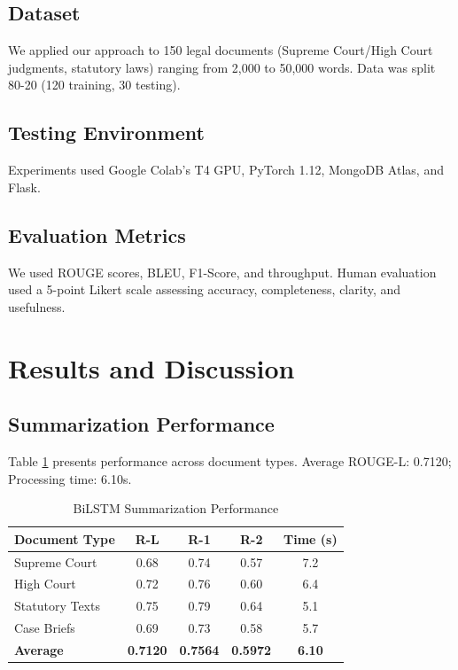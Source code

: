 \documentclass[conference]{IEEEtran}
\begin{document}
\subsection{Dataset}
We applied our approach to 150 legal documents (Supreme Court/High Court judgments, statutory laws) ranging from 2,000 to 50,000 words. Data was split 80-20 (120 training, 30 testing).

\subsection{Testing Environment}
Experiments used Google Colab’s T4 GPU, PyTorch 1.12, MongoDB Atlas, and Flask.

\subsection{Evaluation Metrics}
We used ROUGE scores, BLEU, F1-Score, and throughput. Human evaluation used a 5-point Likert scale assessing accuracy, completeness, clarity, and usefulness.

\section{Results and Discussion}

\subsection{Summarization Performance}
Table \ref{tab:summarization_results} presents performance across document types. Average ROUGE-L: 0.7120; Processing time: 6.10s.

\begin{table}[ht]
\centering
\caption{BiLSTM Summarization Performance}
\label{tab:summarization_results}
\begin{tabular}{@{}lcccc@{}}
\toprule
\textbf{Document Type} & \textbf{R-L} & \textbf{R-1} & \textbf{R-2} & \textbf{Time (s)} \\
\midrule
Supreme Court & 0.68 & 0.74 & 0.57 & 7.2 \\
High Court & 0.72 & 0.76 & 0.60 & 6.4 \\
Statutory Texts & 0.75 & 0.79 & 0.64 & 5.1 \\
Case Briefs & 0.69 & 0.73 & 0.58 & 5.7 \\
\midrule
\textbf{Average} & \textbf{0.7120} & \textbf{0.7564} & \textbf{0.5972} & \textbf{6.10} \\
\bottomrule
\end{tabular}
\end{table}
\end{document}
